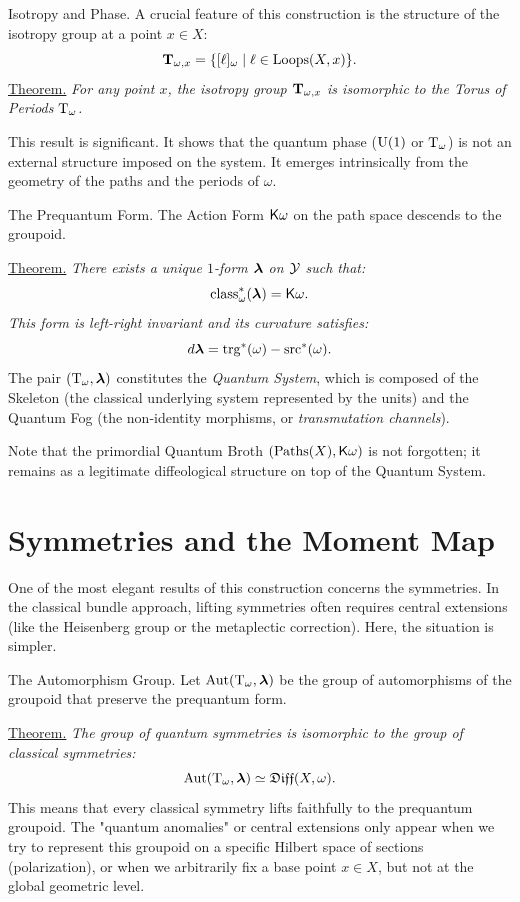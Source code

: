 \begin{Article}{Isotropy and Phase.}{}
  A crucial feature of this construction is the structure of the isotropy group at a point $x \in X$:
  $$%
    \TT_{\omega, x} = \{ [\ell]_\omega \mid \ell \in \Loops(X,x) \}.
  $$%
  \uline{Theorem.} {\itshape For any point $x$,
  the isotropy group ${\mathbf T}_{\omega, x}$ is isomorphic to the Torus of Periods $\mathrm{T}_\omega$.}

  This result is significant.
  It shows that the quantum phase ($\mathrm{U}(1)$ or $\mathrm{T}_\omega$) is not an external structure imposed on the system.
  It emerges intrinsically from the geometry of the paths and the periods of $\omega$.
\end{Article}

\begin{Article}{The Prequantum Form.}{}
  The Action Form $\mathsf{K}\omega$ on the path space descends to the groupoid.

  \uline{Theorem.} {\itshape There exists a unique $1$-form $\boldsymbol \lambda$ on $\mathcal{Y}$ such that:
  $$%
    \Class_\omega^*(\blambda) = \Komega.
  $$%
  This form is left-right invariant and its curvature satisfies:
  $$%
    d\blambda = \Trg^*(\omega) - \Src^*(\omega).
  $$%
  }
  The pair $(\mathrm{T}_\omega, \boldsymbol \lambda)$ constitutes the \emph{Quantum System},
  which is composed of the Skeleton (the classical underlying system represented by the units) and the Quantum Fog (the non-identity morphisms, or \emph{transmutation channels}).

  Note that the primordial Quantum Broth $(\operatorname{Paths}(X),\mathsf{K}\omega)$ is not forgotten;
  it remains as a legitimate diffeological structure on top of the Quantum System.
\end{Article}

\section{Symmetries and the Moment Map}

One of the most elegant results of this construction concerns the symmetries.
In the classical bundle approach,
lifting symmetries often requires central extensions (like the Heisenberg group or the metaplectic correction).
Here,
the situation is simpler.

\begin{Article}{The Automorphism Group.}{}
  Let $\operatorname{Aut}(\mathrm{T}_\omega, \boldsymbol \lambda)$ be the group of automorphisms of the groupoid that preserve the prequantum form.

  \uline{Theorem.} {\itshape The group of quantum symmetries is isomorphic to the group of classical symmetries:
  $$%
    \Aut(\Torus_\omega, \blambda) \simeq \Diff(X, \omega).
  $$%
  }
  This means that every classical symmetry lifts faithfully to the prequantum groupoid.
  The "quantum anomalies" or central extensions only appear when we try to represent this groupoid on a specific Hilbert space of sections (polarization),
  or when we arbitrarily fix a base point $x \in X$,
  but not at the global geometric level.
\end{Article}

